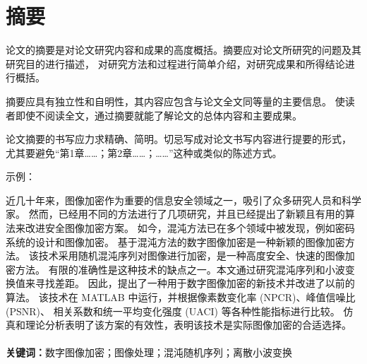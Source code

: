 \chapter{摘\quad 要}

    论文的摘要是对论文研究内容和成果的高度概括。摘要应对论文所研究的问题及其研究目的进行描述，
    对研究方法和过程进行简单介绍，对研究成果和所得结论进行概括。\par
    摘要应具有独立性和自明性，其内容应包含与论文全文同等量的主要信息。
    使读者即使不阅读全文，通过摘要就能了解论文的总体内容和主要成果。\par
    论文摘要的书写应力求精确、简明。切忌写成对论文书写内容进行提要的形式，
    尤其要避免“第1章……；第2章……；……”这种或类似的陈述方式。\par
    示例：\par

    近几十年来，图像加密作为重要的信息安全领域之一，吸引了众多研究人员和科学家。
    然而，已经用不同的方法进行了几项研究，并且已经提出了新颖且有用的算法来改进安全图像加密方案。
    如今，混沌方法已在多个领域中被发现，例如密码系统的设计和图像加密。
    基于混沌方法的数字图像加密是一种新颖的图像加密方法。
    该技术采用随机混沌序列对图像进行加密，是一种高度安全、快速的图像加密方法。
    有限的准确性是这种技术的缺点之一。本文通过研究混沌序列和小波变换值来寻找差距。
    因此，提出了一种用于数字图像加密的新技术并改进了以前的算法。
    该技术在 MATLAB 中运行，并根据像素数变化率 (NPCR)、峰值信噪比 (PSNR)、
    相关系数和统一平均变化强度 (UACI) 等各种性能指标进行比较。
    仿真和理论分析表明了该方案的有效性，表明该技术是实际图像加密的合适选择。\\
    \\ 
    {\bfseries 关键词：}数字图像加密；图像处理；混沌随机序列；离散小波变换

